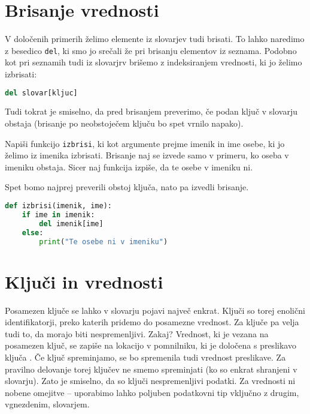 \section{Brisanje vrednosti}

V določenih primerih želimo elemente iz slovarjev tudi brisati. To lahko naredimo z besedico \texttt{del}, ki smo jo srečali že pri brisanju elementov iz seznama. Podobno kot pri seznamih tudi iz slovarjrv brišemo z indeksiranjem vrednosti, ki jo želimo izbrisati:
\begin{lstlisting}[language=Python]
del slovar[kljuc]
\end{lstlisting}
Tudi tokrat je smiselno, da pred brisanjem preverimo, če podan ključ v slovarju obstaja (brisanje po neobstoječem ključu bo spet vrnilo napako).

\begin{zgled}
Napiši funkcijo \texttt{izbrisi}, ki kot argumente prejme imenik in ime osebe, ki jo želimo iz imenika izbrisati. Brisanje naj se izvede samo v primeru, ko oseba v imeniku obstaja. Sicer naj funkcija izpiše, da te osebe v imeniku ni.
\end{zgled}
\begin{resitev}
Spet bomo najprej preverili obstoj ključa, nato pa izvedli brisanje.
\begin{lstlisting}[language=Python]
def izbrisi(imenik, ime):
    if ime in imenik:
        del imenik[ime]
    else:
        print("Te osebe ni v imeniku")
\end{lstlisting}
\end{resitev}

\section{Ključi in vrednosti}

Posamezen ključe se lahko v slovarju pojavi največ enkrat. Ključi so torej enolični identifikatorji, preko katerih pridemo do posamezne vrednost. Za ključe pa velja tudi to, da morajo biti nespremenljivi. Zakaj? Vrednost, ki je vezana na posamezen ključ, se zapiše na lokacijo v pomnilniku, ki je določena s preslikavo ključa . Če ključ spreminjamo, se bo spremenila tudi vrednost preslikave. Za pravilno delovanje torej ključev ne smemo spreminjati (ko so enkrat shranjeni v slovarju). Zato je smiselno, da so ključi nespremenljivi podatki. Za vrednosti ni nobene omejitve -- uporabimo lahko poljuben podatkovni tip vključno z drugim, vgnezdenim, slovarjem.

